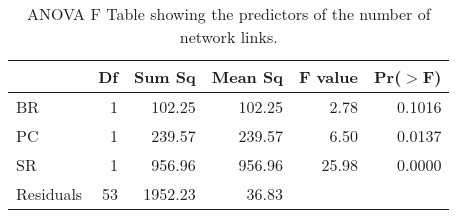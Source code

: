 \begin{table}[ht]
\centering
\begin{tabular}{lrrrrr}
  \hline
 & Df & Sum Sq & Mean Sq & F value & Pr($>$F) \\ 
  \hline
BR & 1 & 102.25 & 102.25 & 2.78 & 0.1016 \\ 
  PC & 1 & 239.57 & 239.57 & 6.50 & 0.0137 \\ 
  SR & 1 & 956.96 & 956.96 & 25.98 & 0.0000 \\ 
  Residuals & 53 & 1952.23 & 36.83 &  &  \\ 
   \hline
\end{tabular}
\caption{ANOVA F Table showing the predictors of the number of network links.} 
\label{tab:L_aov}
\end{table}

